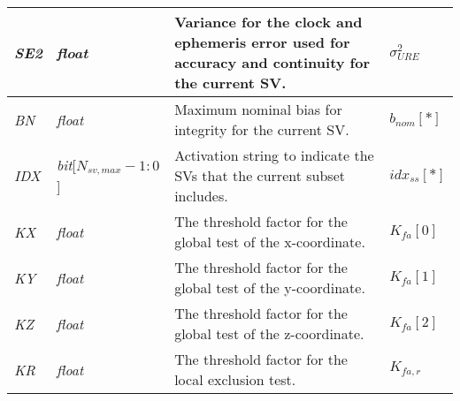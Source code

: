 \documentclass[11pt]{article}
\begin{document}
\begin{table}[htbp]
\begin{center}
\begin{tabular}{|m{1.5cm}|m{2cm}|m{6cm}|m{1.5cm}|}
    \emph{SE2} & \emph{float} & Variance for the clock and ephemeris error used for accuracy and continuity for the current SV. & $\sigma_{URE}^2$\\ \hline

    \emph{BN} & \emph{float} & Maximum nominal bias for integrity for the current SV. & $b_{nom}[*]$\\ \hline

    \emph{IDX} & \emph{bit}[$N_{sv,max}-1:0$] & Activation string to indicate the SVs that the current subset includes. & $idx_{ss}[*]$\\ \hline

    \emph{KX} & \emph{float} & The threshold factor for the global test of the x-coordinate. & $K_{fa}[0]$\\ \hline

    \emph{KY} & \emph{float} & The threshold factor for the global test of the y-coordinate. & $K_{fa}[1]$\\ \hline

    \emph{KZ} & \emph{float} & The threshold factor for the global test of the z-coordinate. & $K_{fa}[2]$\\ \hline

    \emph{KR} & \emph{float} & The threshold factor for the local exclusion test. & $K_{fa,r}$\\ \hline
  \end{tabular}
\end{center}
\end{table}
\end{document}
